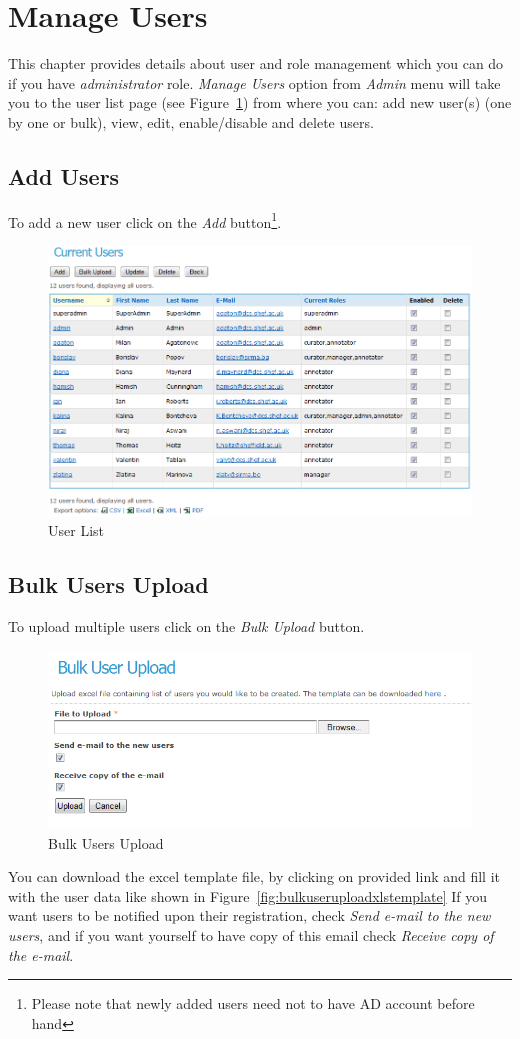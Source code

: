 \section{Manage Users}
This chapter provides details about user and role management which you can
do if you have \emph{administrator} role. \emph{Manage Users} option from
\emph{Admin} menu will take you to the user list page (see Figure~\ref{fig:userlist}) 
from where you can: add new user(s) (one by one or bulk), view, edit,
enable/disable and delete users.
\subsection{Add Users}
To add a new user click on the \emph{Add}
button\footnote{Please note that newly added users need not to have AD account
before hand}.

\begin{figure}[hb!]
\centering
\includegraphics[scale=0.4]{userlist}
\caption{User List}
\label{fig:userlist}
\end{figure}

\subsection{Bulk Users Upload}
To upload multiple users click on
the \emph{Bulk Upload} button.
\begin{figure}[hb!]
\centering
\includegraphics[scale=0.4]{bulkuserupload}
\caption{Bulk Users Upload}
\label{fig:bulkuserupload}
\end{figure}
You can download the excel template file, by clicking on provided link and fill
it with the user data like shown in
Figure~\ref{fig:bulkuseruploadxlstemplate}
If you want users to be notified upon their registration, check \emph{Send
e-mail to the new users}, and if you want yourself to have copy of this email
check \emph{Receive copy of the e-mail}.

